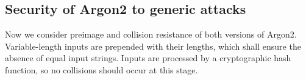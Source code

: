 \documentclass[a4paper]{article}
\begin{document}

\subsection{Security of Argon2 to generic attacks}\label{sec:generic}

Now we consider preimage and collision resistance of both versions of \textsf{Argon2}. Variable-length inputs are prepended with their lengths, which shall ensure
 the absence of equal input strings. Inputs are processed by a cryptographic hash function, so no collisions should occur at this stage.
 
\end{document}
